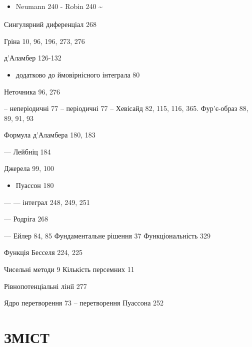 \documentclass[
  ukrainian,
]{article}
\providecommand{\tightlist}{%
  \setlength{\itemsep}{0pt}\setlength{\parskip}{0pt}}
\begin{document}
\begin{itemize}
\tightlist
\item
  Neumann 240 - Robin 240 \textsubscript{}\textasciitilde{}
\end{itemize}

Сингулярний диференціал 268

Гріна 10, 96, 196, 273, 276

д'Аламбер 126-132

\begin{itemize}
\tightlist
\item
  додатково до ймовірнісного інтеграла 80
\end{itemize}

Неточника 96, 276

-- неперіодичні 77 -- періодичні 77 -- Хевісайд 82, 115, 116, 365.
Фур'є-образ 88, 89, 91, 93

Формула д'Аламбера 180, 183

--- Лейбніц 184

Джерела 99, 100

\begin{itemize}
\tightlist
\item
  Пуассон 180
\end{itemize}

--- --- інтеграл 248, 249, 251

--- Родріга 268

--- Ейлер 84, 85 Фундаментальне рішення 37 Функціональність 329

Функція Бесселя 224, 225

Чисельні методи 9 Кількість персемних 11

Рівнопотенціальні лінії 277

Ядро перетворення 73 -- перетворення Пуассона 252

\section{ЗМІСТ}\label{ux437ux43cux456ux441ux442}
\end{document}
